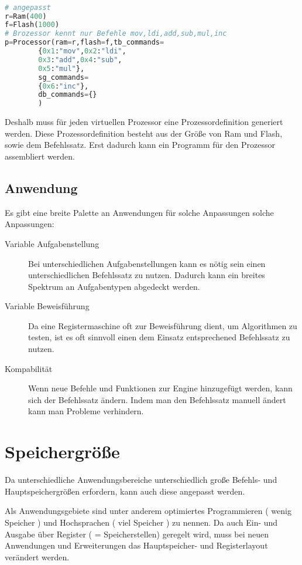 \documentclass[a4paper,12pt,oneside]{scrreprt}
\begin{document}
\begin{lstlisting}[language=python]

# angepasst
r=Ram(400)
f=Flash(1000)
# Brozessor kennt nur Befehle mov,ldi,add,sub,mul,inc
p=Processor(ram=r,flash=f,tb_commands=
		{0x1:"mov",0x2:"ldi",
		0x3:"add",0x4:"sub",
		0x5:"mul"},
		sg_commands=
		{0x6:"inc"},
		db_commands={}
		)

\end{lstlisting}

Deshalb muss für jeden virtuellen Prozessor eine Prozessordefinition generiert werden.
Diese Prozessordefinition besteht aus der Größe von Ram und Flash, sowie dem Befehlssatz.
Erst dadurch kann ein Programm für den Prozessor assembliert werden.

\subsection{Anwendung}

Es gibt eine breite Palette an Anwendungen für solche Anpassungen solche Anpassungen:

\begin{description}

\item[Variable Aufgabenstellung] Bei unterschiedlichen Aufgabenstellungen kann es nötig sein einen unterschiedlichen Befehlssatz zu nutzen.
Dadurch kann ein breites Spektrum an Aufgabentypen abgedeckt werden.

\item[Variable Beweisführung] Da eine Registermaschine oft zur Beweisführung dient, um Algorithmen zu testen, ist es oft sinnvoll 
einen dem Einsatz entsprechened Befehlssatz zu nutzen.

\item[Kompabilität] Wenn neue Befehle und Funktionen zur Engine hinzugefügt werden, kann sich der Befehlssatz ändern.
Indem man den Befehlssatz manuell ändert kann man Probleme verhindern.

\end{description}

\section{Speichergröße}

Da unterschiedliche Anwendungsbereiche unterschiedlich große Befehls- und Hauptspeichergrößen erfordern, 
kann auch diese angepasst werden.

Als Anwendungsgebiete sind unter anderem optimiertes Programmieren ( wenig Speicher ) und Hochsprachen ( viel Speicher )
zu nennen. Da auch Ein- und Ausgabe über Register ( = Speicherstellen) geregelt wird, muss bei neuen Anwendungen und
Erweiterungen  das Hauptspeicher- und Registerlayout verändert werden.
\end{document}
